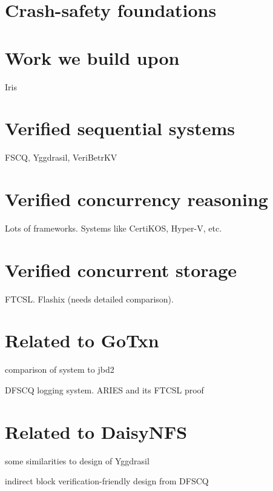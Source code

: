 \section{Crash-safety foundations}

\section{Work we build upon}%

Iris

\section{Verified sequential systems}

FSCQ, Yggdrasil, VeriBetrKV

\section{Verified concurrency reasoning}

Lots of frameworks. Systems like CertiKOS, Hyper-V, etc.

\section{Verified concurrent
storage}

FTCSL. Flashix (needs detailed comparison).

\section{Related to GoTxn}

comparison of system to jbd2

DFSCQ logging system. ARIES and its FTCSL proof



\section{Related to DaisyNFS}

some similarities to design of Yggdrasil

indirect block verification-friendly design from DFSCQ


